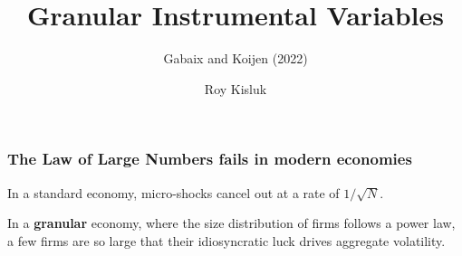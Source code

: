 \documentclass[aspectratio=169,11pt]{beamer}
\begin{document}
\begin{frame}
    \title{Granular Instrumental Variables}
    \subtitle{Gabaix and Koijen (2022)}
    \author{Roy Kisluk}
    \date{}
    \titlepage
\end{frame}



\begin{frame}
    \frametitle{The Law of Large Numbers fails in modern economies}

    \vspace{1cm}
    {\Large
        In a standard economy, micro-shocks cancel out at a rate of $1/\sqrt{N}$\hyperlink{sqrtn}{}.

    }

    \vspace{1cm}
    {\Large
        In a \textbf{granular} economy, where the size distribution of firms follows a power law, a few firms are so large that their idiosyncratic luck drives aggregate volatility.
    }

\end{frame}




\end{document}
